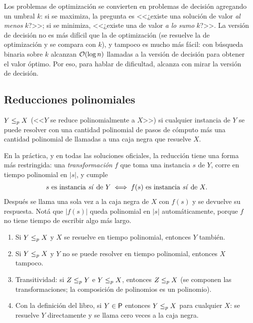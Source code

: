 Los problemas de optimización se convierten en problemas de decisión agregando un umbral $k$: si se maximiza, la pregunta es <<¿existe una solución de valor \emph{al menos} $k$?>>; si se minimiza, <<¿existe una de valor \emph{a lo sumo} $k$?>>. La versión de decisión no es más difícil que la de optimización (se resuelve la de optimización y se compara con $k$), y tampoco es mucho más fácil: con búsqueda binaria sobre $k$ alcanzan $\Oh(\log n)$ llamadas a la versión de decisión para obtener el valor óptimo. Por eso, para hablar de dificultad, alcanza con mirar la versión de decisión.

\subsection{Reducciones polinomiales}

\begin{definicion}
$Y\redp X$ (<<$Y$ se reduce polinomialmente a $X$>>) si cualquier instancia de $Y$ se puede resolver con una cantidad polinomial de pasos de cómputo más una cantidad polinomial de llamadas a una caja negra que resuelve $X$.
\end{definicion}

En la práctica, y en todas las soluciones oficiales, la reducción tiene una forma más restringida: una \emph{transformación} $f$ que toma una instancia $s$ de $Y$, corre en tiempo polinomial en $|s|$, y cumple
\[
  s \text{ es instancia \npsi\ de } Y \iff f(s) \text{ es instancia \npsi\ de } X .
\]
Después se llama una sola vez a la caja negra de $X$ con $f(s)$ y se devuelve su respuesta. Notá que $|f(s)|$ queda polinomial en $|s|$ automáticamente, porque $f$ no tiene tiempo de escribir algo más largo.

\begin{resultado}
\begin{enumerate}[label=(\roman*)]
  \item Si $Y\redp X$ y $X$ se resuelve en tiempo polinomial, entonces $Y$ también.
  \item Si $Y\redp X$ y $Y$ no se puede resolver en tiempo polinomial, entonces $X$ tampoco.
  \item Transitividad: si $Z\redp Y$ e $Y\redp X$, entonces $Z\redp X$ (se componen las transformaciones; la composición de polinomios es un polinomio).
  \item Con la definición del libro, si $Y\in\Pclass$ entonces $Y\redp X$ para cualquier $X$: se resuelve $Y$ directamente y se llama cero veces a la caja negra.
\end{enumerate}
\end{resultado}

